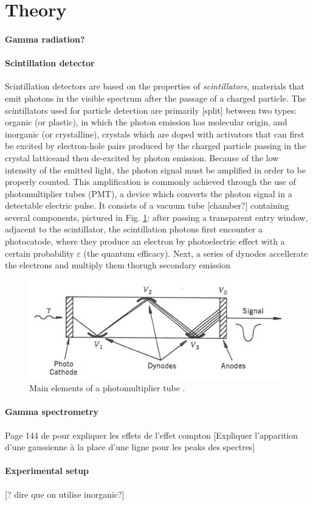 \section{Theory}
\paragraph{Gamma radiation?}

\paragraph{Scintillation detector}
Scintillation detectors are based on the properties of \emph{scintillators}, materials that emit photons in the visible spectrum after the passage of a charged particle.
The scintillators used for particle detection are primarily [split] between two types: organic (or plastic), in which the photon emission has molecular origin, 
and inorganic (or crystalline), crystals which are doped with activators that can first be excited by electron-hole pairs 
produced by the charged particle passing in the crystal lattice\footnotemark and then de-excited by photon emission\cite{intro_nuclear_particle_physics}.
Because of the low intensity of the emitted light, the photon signal must be amplified in order to be properly counted.
This amplification is commonly achieved through the use of photomultiplier tubes (PMT), a device which converts the photon signal in a detectable electric pulse.
It consists of a vacuum tube [chamber?] containing several components, pictured in Fig. \ref{fig:photomultiplier}: 
after passing a transparent entry window, adjacent to the scintillator, the scintillation photons first encounter a photocatode, 
where they produce an electron by photoelectric effect with a certain probability $\varepsilon$ (the quantum efficacy).
Next, a series of dynodes accellerate the electrons and multiply them thorugh secondary emission
\begin{figure}[htbp]
    \centering
    \includegraphics[scale=1]{figures/photomultiplier.jpg}
    \caption{Main elements of a photomultiplier tube \cite{intro_nuclear_particle_physics}.}
    \label{fig:photomultiplier}
\end{figure}

\paragraph{Gamma spectrometry}
Page 144 de \cite{intro_nuclear_particle_physics} pour expliquer les effets de l'effet compton
[Expliquer l'apparition d'une gaussienne à la place d'une ligne pour les peaks des spectres]


\paragraph{Experimental setup}
[? dire que on utilise inorganic?]